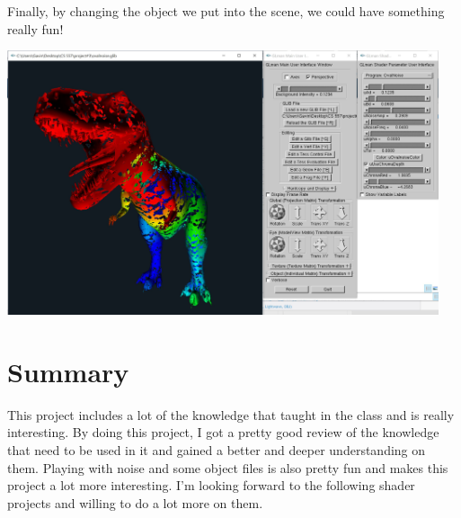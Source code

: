 \documentclass[letterpaper,14pt,titlepage,fleqn]{article}
\begin{document}
Finally, by changing the object we put into the scene, we could have something really fun!
\begin{center}
	\includegraphics[width=5in]{FUN.jpg}
\end{center}
\section{Summary}
This project includes a lot of the knowledge that taught in the class and is really interesting. By doing this project, I got a pretty good review of the knowledge that need to be used in it and gained a better and deeper understanding on them. Playing with noise and some object files is also pretty fun and makes this project a lot more interesting. I'm looking forward to the following shader projects and willing to do a lot more on them.
\end{document}
